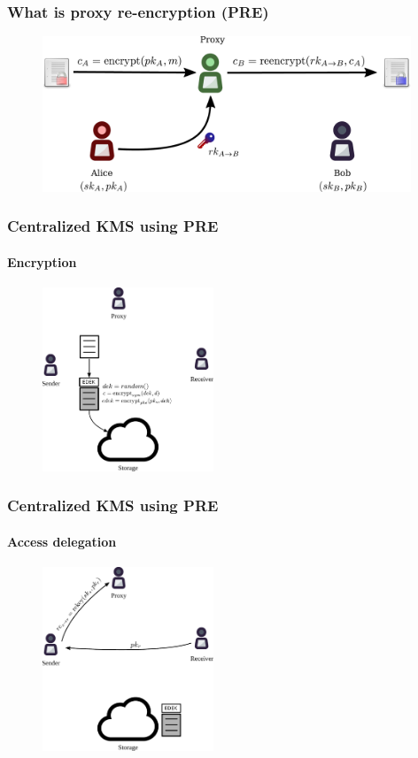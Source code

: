 \documentclass[xetex,mathsans,sans,aspectratio=169]{beamer}
\begin{document}
    \begin{frame}
        \frametitle{What is proxy re-encryption (PRE)}
        \begin{figure}
            \centering
            \includegraphics[width=11cm]{pdf/pre.pdf}
        \end{figure}
    \end{frame}

    \begin{frame}
        \frametitle{Centralized KMS using PRE}
        \framesubtitle{Encryption}
        \begin{figure}
            \centering
            \includegraphics[height=5.5cm]{pdf/encrypt.pdf}
        \end{figure}
    \end{frame}

    \begin{frame}
        \frametitle{Centralized KMS using PRE}
        \framesubtitle{Access delegation}
        \begin{figure}
            \centering
            \includegraphics[height=5.5cm]{pdf/delegate.pdf}
        \end{figure}
    \end{frame}
\end{document}
